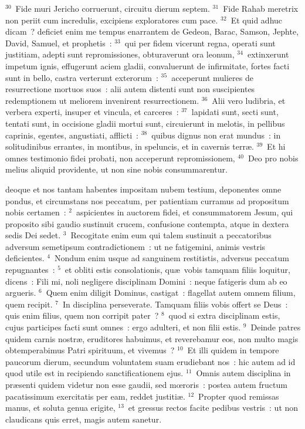 ${}^{30}$~Fide muri Jericho corruerunt, circuitu dierum septem.
${}^{31}$~Fide Rahab meretrix non periit cum incredulis, excipiens exploratores cum pace.
${}^{32}$~Et quid adhuc dicam~? deficiet enim me tempus enarrantem de Gedeon, Barac, Samson, Jephte, David, Samuel, et prophetis~:
${}^{33}$~qui per fidem vicerunt regna, operati sunt justitiam, adepti sunt repromissiones, obturaverunt ora leonum,
${}^{34}$~extinxerunt impetum ignis, effugerunt aciem gladii, convaluerunt de infirmitate, fortes facti sunt in bello, castra verterunt exterorum~:
${}^{35}$~acceperunt mulieres de resurrectione mortuos suos~: alii autem distenti sunt non suscipientes redemptionem ut meliorem invenirent resurrectionem.
${}^{36}$~Alii vero ludibria, et verbera experti, insuper et vincula, et carceres~:
${}^{37}$~lapidati sunt, secti sunt, tentati sunt, in occisione gladii mortui sunt, circuierunt in melotis, in pellibus caprinis, egentes, angustiati, afflicti~:
${}^{38}$~quibus dignus non erat mundus~: in solitudinibus errantes, in montibus, in speluncis, et in cavernis terr\ae .
${}^{39}$~Et hi omnes testimonio fidei probati, non acceperunt repromissionem,
${}^{40}$~Deo pro nobis melius aliquid providente, ut non sine nobis consummarentur.

\bchapter
{}deoque et nos tantam habentes impositam nubem testium, deponentes omne pondus, et circumstans nos peccatum, per patientiam curramus ad propositum nobis certamen~:
${}^{2}$~aspicientes in auctorem fidei, et consummatorem Jesum, qui proposito sibi gaudio sustinuit crucem, confusione contempta, atque in dextera sedis Dei sedet.
${}^{3}$~Recogitate enim eum qui talem sustinuit a peccatoribus adversum semetipsum contradictionem~: ut ne fatigemini, animis vestris deficientes.
${}^{4}$~Nondum enim usque ad sanguinem restitistis, adversus peccatum repugnantes~:
${}^{5}$~et obliti estis consolationis, qu\ae\ vobis tamquam filiis loquitur, dicens~: Fili mi, noli negligere disciplinam Domini~: neque fatigeris dum ab eo argueris.
${}^{6}$~Quem enim diligit Dominus, castigat~: flagellat autem omnem filium, quem recipit.
${}^{7}$~In disciplina perseverate. Tamquam filiis vobis offert se Deus~: quis enim filius, quem non corripit pater~?
${}^{8}$~quod si extra disciplinam estis, cujus participes facti sunt omnes~: ergo adulteri, et non filii estis.
${}^{9}$~Deinde patres quidem carnis nostr\ae , eruditores habuimus, et reverebamur eos, non multo magis obtemperabimus Patri spirituum, et vivemus~?
${}^{10}$~Et illi quidem in tempore paucorum dierum, secundum voluntatem suam erudiebant nos~: hic autem ad id quod utile est in recipiendo sanctificationem ejus.
${}^{11}$~Omnis autem disciplina in pr\ae senti quidem videtur non esse gaudii, sed mœroris~: postea autem fructum pacatissimum exercitatis per eam, reddet justiti\ae .
${}^{12}$~Propter quod remissas manus, et soluta genua erigite,
${}^{13}$~et gressus rectos facite pedibus vestris~: ut non claudicans quis erret, magis autem sanetur.


